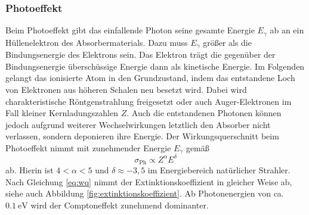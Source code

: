 \subsubsection{Photoeffekt}
\label{sec:photo}
Beim Photoeffekt gibt das einfallende Photon seine gesamte Energie $E_\gamma$ ab an ein Hüllenelektron des Absorbermaterials. Dazu muss $E_\gamma$ größer als die Bindungsenergie des Elektrons sein. Das Elektron trägt die gegenüber der Bindungsenergie überschüssige Energie dann als kinetische Energie. Im Folgenden gelangt das ionisierte Atom in den Grundzustand, indem das entstandene Loch von Elektronen aus höheren Schalen neu besetzt wird. Dabei wird charakteristische Röntgenstrahlung freigesetzt oder auch Auger-Elektronen im Fall kleiner Kernladungszahlen $Z$. Auch die entstandenen Photonen können jedoch aufgrund weiterer Wechselwirkungen letztlich den Absorber nicht verlassen, sondern deponieren ihre Energie. Der Wirkungsquerschnitt beim Photoeffekt nimmt mit zunehmender Energie $E_\gamma$ gemäß
\begin{equation}
  \sigma_{\text{Ph}} \propto Z^\alpha E^\delta
  \label{eq:photoeffekt_wq}
\end{equation}
ab. Hierin ist $4<\alpha<5$ und $\delta\approx -3,5$ im Energiebereich natürlicher Strahler. Nach Gleichung \eqref{eq:wq} nimmt der Extinktionskoeffizient in gleicher Weise ab, siehe auch Abbildung \ref{fig:extinktionskoeffizient}. Ab Photonenergien von ca. $\SI{0.1}{\electronvolt}$ wird der Comptoneffekt zunehmend dominanter.


